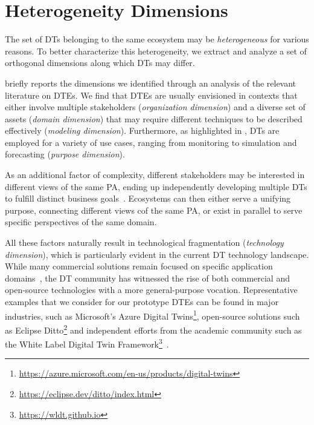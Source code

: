 \section{Heterogeneity Dimensions}
\label{ssec:dimensions}


The set of \acp{DT} belonging to the same ecosystem may be \emph{heterogeneous} for various reasons.
To better characterize this heterogeneity, we extract and analyze a set of orthogonal dimensions along which \acp{DT} may differ.

 briefly reports the dimensions we identified through an analysis of the relevant literature on \acp{DTE}.
We find that \acp{DTE} are usually envisioned in contexts that either involve multiple stakeholders (\emph{organization dimension}) and a diverse set of assets (\emph{domain dimension}) that may require different techniques to be described effectively (\emph{modeling dimension}).
Furthermore, as highlighted in , \acp{DT} are employed for a variety of use cases, ranging from monitoring to simulation and forecasting (\emph{purpose dimension}).

As an additional factor of complexity, different stakeholders may be interested in different views of the same \ac{PA}, ending up independently developing multiple \acp{DT} to fulfill distinct business goals~\cite{minerva2020dtiot}.
%
Ecosystems can then either serve a unifying purpose, connecting different views cof the same \ac{PA}, or exist in parallel to serve specific perspectives of the same domain.

All these factors naturally result in technological fragmentation (\emph{technology dimension}), which is particularly evident in the current \ac{DT} technology landscape.
%
While many commercial solutions remain focused on specific application domains~\cite{Damjanovic-Behrendt_Behrendt_2019}, the \ac{DT} community has witnessed the rise of both commercial and open-source technologies with a more general-purpose vocation.
%
Representative examples that we consider for our prototype \acp{DTE} can be found in major industries, such as Microsoft's Azure Digital Twins\footnote{\url{https://azure.microsoft.com/en-us/products/digital-twins}}, open-source solutions such as Eclipse Ditto\footnote{\url{https://eclipse.dev/ditto/index.html}} and independent efforts from the academic community such as the White Label Digital Twin Framework\footnote{\url{https://wldt.github.io}}~\cite{picone2021wldt}.

